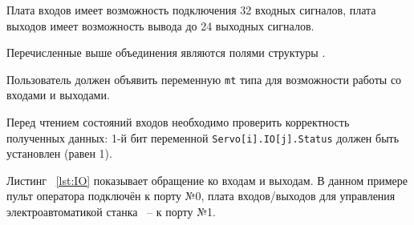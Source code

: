 \BL

Плата входов имеет возможность подключения 32 входных сигналов, плата выходов имеет возможность вывода до 24 выходных сигналов.

Перечисленные выше объединения являются полями структуры .

Пользователь должен объявить переменную \texttt{mt} типа  для возможности работы со входами и выходами.


Перед чтением состояний входов необходимо проверить корректность полученных данных: 1-й бит переменной \texttt{Servo[i].IO[j].Status} должен быть установлен (равен 1).

Листинг ~\ref{lst:IO} показывает обращение ко входам и выходам. В данном примере пульт оператора подключён к порту №0, плата входов/выходов для управления электроавтоматикой станка ~-- к порту №1. \killoverfullbefore \BL


